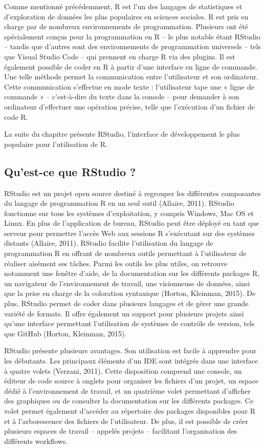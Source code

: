 \documentclass[
  letterpaper,
  DIV=11,
  numbers=noendperiod]{scrreprt}
\begin{document}
Comme mentionné précédemment, R est l'un des langages de statistiques et
d'exploration de données les plus populaires en sciences sociales. R est
pris en charge par de nombreux environnements de programmation.
Plusieurs ont été spécialement conçus pour la programmation en R -- le
plus notable étant RStudio -- tandis que d'autres sont des
environnements de programmation universels -- tels que Visual Studio
Code -- qui prennent en charge R via des plugins. Il est également
possible de coder en R à partir d'une interface en ligne de commande.
Une telle méthode permet la communication entre l'utilisateur et son
ordinateur. Cette communication s'effectue en mode texte : l'utilisateur
tape une « ligne de commande » -- c'est-à-dire du texte dans la console
-- pour demander à son ordinateur d'effectuer une opération précise,
telle que l'exécution d'un fichier de code R.

La suite du chapitre présente RStudio, l'interface de développement le
plus populaire pour l'utilisation de R.

\subsection{Qu'est-ce que RStudio ?}\label{quest-ce-que-rstudio}

RStudio est un projet open source destiné à regrouper les différentes
composantes du langage de programmation R en un seul outil (Allaire,
2011). RStudio fonctionne sur tous les systèmes d'exploitation, y
compris Windows, Mac OS et Linux. En plus de l'application de bureau,
RStudio peut être déployé en tant que serveur pour permettre l'accès Web
aux sessions R s'exécutant sur des systèmes distants (Allaire, 2011).
RStudio facilite l'utilisation du langage de programmation R en offrant
de nombreux outils permettant à l'utilisateur de réaliser aisément ses
tâches. Parmi les outils les plus utiles, on retrouve notamment une
fenêtre d'aide, de la documentation sur les différents packages R, un
navigateur de l'environnement de travail, une visionneuse de données,
ainsi que la prise en charge de la coloration syntaxique (Horton,
Kleinman, 2015). De plus, RStudio permet de coder dans plusieurs
langages et de gérer une grande variété de formats. Il offre également
un support pour plusieurs projets ainsi qu'une interface permettant
l'utilisation de systèmes de contrôle de version, tels que GitHub
(Horton, Kleinman, 2015).

RStudio présente plusieurs avantages. Son utilisation est facile à
apprendre pour les débutants. Les principaux éléments d'un IDE sont
intégrés dans une interface à quatre volets (Verzani, 2011). Cette
disposition comprend une console, un éditeur de code source à onglets
pour organiser les fichiers d'un projet, un espace dédié à
l'environnement de travail, et un quatrième volet permettant d'afficher
des graphiques ou de consulter la documentation sur les différents
packages. Ce volet permet également d'accéder au répertoire des packages
disponibles pour R et à l'arborescence des fichiers de l'utilisateur. De
plus, il est possible de créer plusieurs espaces de travail -- appelés
projets -- facilitant l'organisation des différents workflows.
\end{document}
